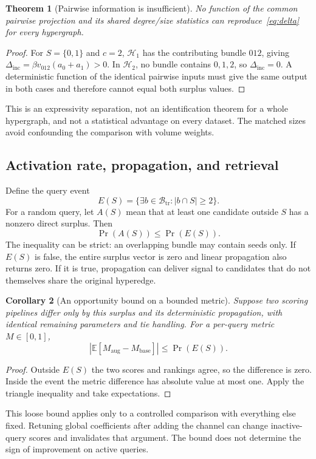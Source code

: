 \documentclass[11pt,a4paper]{article}
\newtheorem{theorem}{Theorem}[section]
\newtheorem{corollary}[theorem]{Corollary}
\theoremstyle{remark}
\newcommand{\E}{\mathbb{E}}
\newcommand{\inc}{\Delta_{\mathrm{inc}}}
\newcommand{\calB}{\mathcal{B}_{\mathrm{tr}}}
\begin{document}
\begin{theorem}[Pairwise information is insufficient]
No function of the common pairwise projection and its shared degree/size
statistics can reproduce~\eqref{eq:delta} for every hypergraph.
\end{theorem}
\begin{proof}
For $S=\{0,1\}$ and $c=2$, $\mathcal H_1$ has the contributing bundle
$012$, giving $\inc=\beta v_{012}(a_0+a_1)>0$. In $\mathcal H_2$, no
bundle contains $0,1,2$, so $\inc=0$. A deterministic function of the
identical pairwise inputs must give the same output in both cases and
therefore cannot equal both surplus values.
\end{proof}
This is an expressivity separation, not an identification theorem for a
whole hypergraph, and not a statistical advantage on every dataset.
The matched sizes avoid confounding the comparison with volume weights.

\subsection{Activation rate, propagation, and retrieval}
Define the query event
\begin{equation}
 E(S)=\{\exists b\in\calB: |b\cap S|\geq2\}.
\end{equation}
For a random query, let $A(S)$ mean that at least one candidate outside $S$
has a nonzero direct surplus. Then
\begin{equation}
 \Pr(A(S))\leq\Pr(E(S)).
 \label{eq:activation}
\end{equation}
The inequality can be strict: an overlapping bundle may contain seeds only.
If $E(S)$ is false, the entire surplus vector is zero and linear propagation
also returns zero. If it is true, propagation can deliver signal to candidates
that do not themselves share the original hyperedge.

\begin{corollary}[An opportunity bound on a bounded metric]
Suppose two scoring pipelines differ only by this surplus and its deterministic
propagation, with identical remaining parameters and tie handling. For a
per-query metric $M\in[0,1]$,
\begin{equation}
 \left|\E[M_{\mathrm{aug}}-M_{\mathrm{base}}]\right|
 \leq\Pr(E(S)).
\end{equation}
\end{corollary}
\begin{proof}
Outside $E(S)$ the two scores and rankings agree, so the difference is zero.
Inside the event the metric difference has absolute value at most one.
Apply the triangle inequality and take expectations.
\end{proof}
This loose bound applies only to a controlled comparison with everything
else fixed. Retuning global coefficients after adding the channel can
change inactive-query scores and invalidates that argument. The bound
does not determine the sign of improvement on active queries.
\end{document}
